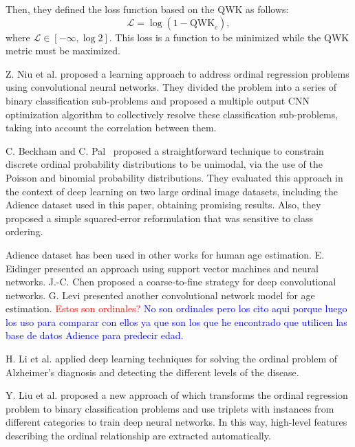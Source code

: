 \documentclass[journal]{IEEEtran}
\begin{document}
	Then, they defined the loss function based on the QWK as follows:
	\begin{equation}
	\mathscr{L} = \log(1 - \text{QWK}_c),
	\end{equation}
	where $\mathscr{L} \in [-\infty, \log 2]$. This loss is a function to be minimized while the QWK metric must be maximized.
	
	Z. Niu et al. \cite{niu2016ordinal} proposed a learning approach to address ordinal regression problems using convolutional neural networks. They divided the problem into a series of binary classification sub-problems and proposed a multiple output CNN optimization algorithm to collectively resolve these classification sub-problems, taking into account the correlation between them.
	
	C. Beckham and C. Pal~\cite{beckham2017unimodal} proposed a straightforward technique to constrain discrete ordinal probability distributions to be unimodal, via the use of the Poisson and binomial probability distributions. They evaluated this approach in the context of deep learning on two large ordinal image datasets, including the Adience dataset used in this paper, obtaining promising results. Also, they proposed a simple squared-error reformulation \cite{beckham2016simple} that was sensitive to class ordering.
	
	Adience dataset has been used in other works for human age estimation. E. Eidinger \cite{eidinger2014age} presented an approach using support vector machines and neural networks. J.-C. Chen \cite{chen2016cascaded} proposed a coarse-to-fine strategy for deep convolutional networks. G. Levi \cite{levi2015age} presented another convolutional network model for age estimation. \textcolor{red}{Estos son ordinales?} \textcolor{blue}{No son ordinales pero los cito aqui porque luego los uso para comparar con ellos ya que son los que he encontrado que utilicen las base de datos Adience para predecir edad.}
	
	H. Li et al. \cite{li2017deep} applied deep learning techniques for solving the ordinal problem of Alzheimer's diagnosis and detecting the different levels of the disease.
	
	Y. Liu et al. \cite{liu2017deep} proposed a new approach of which transforms the ordinal regression problem to binary classification problems and use triplets with instances from different categories to train deep neural networks. In this way, high-level features describing the ordinal relationship are extracted automatically.
	
\end{document}
